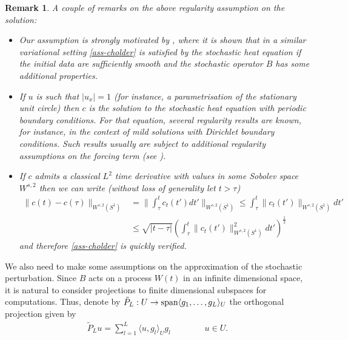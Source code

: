 \documentclass[a4paper,10pt]{article}
\newtheorem{rem}[cor]{Remark}
\def\proj{\tilde{P}}
\numberwithin{equation}{section}
\begin{document}
\begin{rem}\label{remNU1}
A couple of remarks on the above regularity assumption on the solution:
\begin{itemize}
 \item
 Our assumption is strongly motivated by \cite[Theorem~2.2]{BDE}, where it is shown that in a similar variational setting \eqref{ass-cholder} is satisfied by the stochastic heat equation if the initial data are sufficiently smooth and the stochastic operator $B$ has some additional properties.

 \item
 If $u$ is such that $|u_{x}|=1$ (for instance, a parametrisation of the stationary unit circle) then $c$ is the solution to the stochastic heat equation with periodic boundary conditions.
 For that equation, several regularity results are known, for instance, \cite[\S~10.4]{Powell} in the context of mild solutions with Dirichlet boundary conditions. Such results usually are subject to additional regularity assumptions on the forcing term (see \cite[Assumption~10.23]{Powell}).

 \item
 If $c$ admits a classical $L^2$ time derivative with values in some Sobolev space $W^{s,2}$ then we can write (without loss of generality let $t > \tau$)
 \begin{align*}
 \| c(t) - c(\tau) \|_{W^{s,2}(S^{1})} &=\|\int_{\tau}^{t} c_{t}(t') dt' \|_{W^{s,2}(S^{1})}\leq
 \int_{\tau}^{t}\| c_{t}(t') \|_{W^{s,2}(S^{1})} dt'\\
 &\leq \sqrt{|t -\tau|} (\int_{\tau}^{t}\| c_{t}(t') \|_{W^{s,2}(S^{1})}^{2} dt')^{\frac{1}{2}}
 \end{align*}
 and therefore \eqref{ass-cholder} is quickly verified.
 
\end{itemize}
 \end{rem}

We also need to make some assumptions on the approximation of the stochastic perturbation.
Since $B$ acts on a process $W(t)$ in an infinite dimensional space, it is natural to consider projections to finite dimensional subspaces for computations. Thus, denote by $\proj_{L}: U \to {\rm span} \langle g_{1}, \ldots, g_{L} \rangle_{U}$ the orthogonal projection given by
\begin{align}\label{P-tilde}
 \proj_{L} u = \sum_{l=1}^{L} \langle u, g_{l} \rangle_{U} g_{l} \qquad \qquad u \in U.
\end{align}
\end{document}
